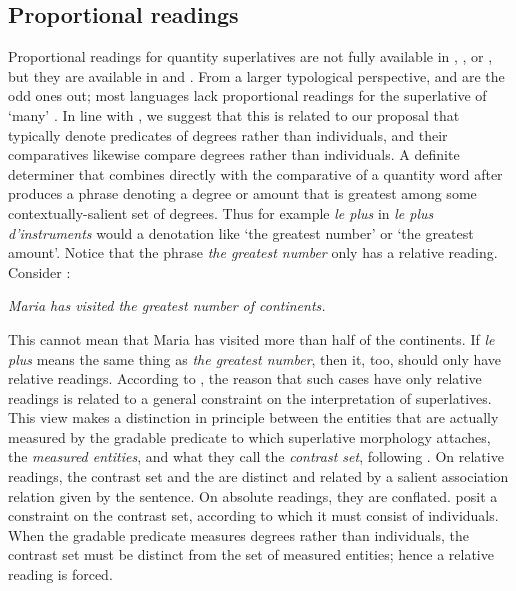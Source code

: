 \documentclass[output=paper
,modfonts
,nonflat]{langsci/langscibook}
\begin{document}
\subsection{Proportional readings}

Proportional readings for quantity superlatives are not fully available in , , or , but they are available in  and . From a larger typological perspective,  and  are the odd ones out; most languages lack proportional readings for the superlative of `many' \citep{CoppockEtAlii2017}. In line with \citet{CoppockEtAliiinprep}, 
 we suggest that this is related to our proposal that  typically denote predicates of degrees rather than individuals, and their comparatives likewise compare degrees rather than individuals. A definite determiner that combines directly with the comparative of a quantity word after  produces a phrase denoting a degree or amount that is greatest among some contextually-salient set of degrees. Thus for example \textit{le plus} in \textit{le plus d'instruments} would a denotation like `the greatest number' or `the greatest amount'. Notice that the phrase \textit{the greatest number} only has a relative reading. Consider :

\ea \label{ex:coppockstrand:109}
\textit{Maria has visited the greatest number of continents.}
\z 

This cannot mean that Maria has visited more than half of the continents. If \textit{le plus} means the same thing as \textit{the greatest number}, then it, too, should only have relative readings. According to \citet{CoppockEtAliiinprep}, the reason that such cases have only relative readings is related to a general constraint on the interpretation of superlatives. This view makes a distinction in principle between the entities that are actually measured by the gradable predicate to which superlative morphology attaches, the \textit{measured entities}, and what they call the \textit{contrast set}, following \citet{CoppockBeaver2014}. On relative readings, the contrast set and the  are distinct and related by a salient association relation given by the sentence. On absolute readings, they are conflated. \citet{CoppockEtAliiinprep} posit a constraint on the contrast set, according to which it must consist of individuals. When the gradable predicate measures degrees rather than individuals, the contrast set must be distinct from the set of measured entities; hence a relative reading is forced.
\end{document}
